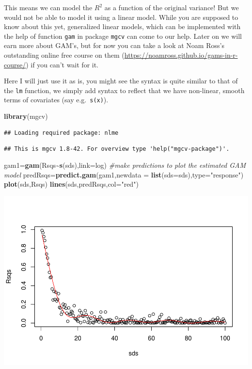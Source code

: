 \documentclass[
]{book}
\newenvironment{Shaded}{\begin{snugshade}}{\end{snugshade}}
\newcommand{\AttributeTok}[1]{\textcolor[rgb]{0.13,0.29,0.53}{#1}}
\newcommand{\CommentTok}[1]{\textcolor[rgb]{0.56,0.35,0.01}{\textit{#1}}}
\newcommand{\FunctionTok}[1]{\textcolor[rgb]{0.13,0.29,0.53}{\textbf{#1}}}
\newcommand{\NormalTok}[1]{#1}
\newcommand{\OtherTok}[1]{\textcolor[rgb]{0.56,0.35,0.01}{#1}}
\newcommand{\SpecialCharTok}[1]{\textcolor[rgb]{0.81,0.36,0.00}{\textbf{#1}}}
\newcommand{\StringTok}[1]{\textcolor[rgb]{0.31,0.60,0.02}{#1}}
\begin{document}
This means we can model the \(R^2\) as a function of the original variance! But we would not be able to model it using a linear model. While you are supposed to know about this yet, generalized linear models, which can be implemented with the help of function \texttt{gam} in package \texttt{mgcv} can come to our help. Later on we will earn more about GAM's, but for now you can take a look at Noam Ross's outstanding online free course on them (\url{https://noamross.github.io/gams-in-r-course/}) if you can't wait for it.

Here I will just use it as is, you might see the syntax is quite similar to that of the \texttt{lm} function, we simply add syntax to reflect that we have non-linear, smooth terms of covariates (say e.g.~\texttt{s(x)}).

\begin{Shaded}
\begin{Highlighting}[]
\FunctionTok{library}\NormalTok{(mgcv)}
\end{Highlighting}
\end{Shaded}

\begin{verbatim}
## Loading required package: nlme
\end{verbatim}

\begin{verbatim}
## This is mgcv 1.8-42. For overview type 'help("mgcv-package")'.
\end{verbatim}

\begin{Shaded}
\begin{Highlighting}[]
\NormalTok{gam1}\OtherTok{=}\FunctionTok{gam}\NormalTok{(Rsqs}\SpecialCharTok{\textasciitilde{}}\FunctionTok{s}\NormalTok{(sds),}\AttributeTok{link=}\NormalTok{log)}
\CommentTok{\#make predictions to plot the estimated GAM model}
\NormalTok{predRsqs}\OtherTok{=}\FunctionTok{predict.gam}\NormalTok{(gam1,}\AttributeTok{newdata =} \FunctionTok{list}\NormalTok{(}\AttributeTok{sds=}\NormalTok{sds),}\AttributeTok{type=}\StringTok{"response"}\NormalTok{)}
\FunctionTok{plot}\NormalTok{(sds,Rsqs)}
\FunctionTok{lines}\NormalTok{(sds,predRsqs,}\AttributeTok{col=}\StringTok{"red"}\NormalTok{)}
\end{Highlighting}
\end{Shaded}

\includegraphics{ECOMODbook_files/figure-latex/a6.32-1.pdf}
\end{document}
